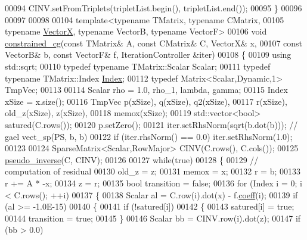 \begin{DoxyCode}
00094   CINV.setFromTriplets(tripletList.begin(), tripletList.end());
00095 \}
00096 
00097 
00098 
00104 \textcolor{keyword}{template}<\textcolor{keyword}{typename} TMatrix, \textcolor{keyword}{typename} CMatrix,
00105          \textcolor{keyword}{typename} \hyperlink{group___core___module}{VectorX}, \textcolor{keyword}{typename} VectorB, \textcolor{keyword}{typename} VectorF>
00106 \textcolor{keywordtype}{void} \hyperlink{namespace_eigen_1_1internal_a1c2f99746877fd46158af4a6b7dce2f9}{constrained\_cg}(\textcolor{keyword}{const} TMatrix& A, \textcolor{keyword}{const} CMatrix& C, VectorX& x,
00107                        \textcolor{keyword}{const} VectorB& b, \textcolor{keyword}{const} VectorF& f, IterationController &iter)
00108 \{
00109   \textcolor{keyword}{using} std::sqrt;
00110   \textcolor{keyword}{typedef} \textcolor{keyword}{typename} TMatrix::Scalar Scalar;
00111   \textcolor{keyword}{typedef} \textcolor{keyword}{typename} TMatrix::Index \hyperlink{namespace_eigen_a62e77e0933482dafde8fe197d9a2cfde}{Index};
00112   \textcolor{keyword}{typedef} Matrix<Scalar,Dynamic,1>  TmpVec;
00113 
00114   Scalar rho = 1.0, rho\_1, lambda, gamma;
00115   Index xSize = x.size();
00116   TmpVec  p(xSize), q(xSize), q2(xSize),
00117           r(xSize), old\_z(xSize), z(xSize),
00118           memox(xSize);
00119   std::vector<bool> satured(C.rows());
00120   p.setZero();
00121   iter.setRhsNorm(sqrt(b.dot(b))); \textcolor{comment}{// gael vect\_sp(PS, b, b)}
00122   \textcolor{keywordflow}{if} (iter.rhsNorm() == 0.0) iter.setRhsNorm(1.0);
00123 
00124   SparseMatrix<Scalar,RowMajor> CINV(C.rows(), C.cols());
00125   \hyperlink{namespace_eigen_1_1internal_a58a0ccf0e71d88beeb5dcf72ed0bdd5f}{pseudo\_inverse}(C, CINV);
00126 
00127   \textcolor{keywordflow}{while}(\textcolor{keyword}{true})
00128   \{
00129     \textcolor{comment}{// computation of residual}
00130     old\_z = z;
00131     memox = x;
00132     r = b;
00133     r += A * -x;
00134     z = r;
00135     \textcolor{keywordtype}{bool} transition = \textcolor{keyword}{false};
00136     \textcolor{keywordflow}{for} (Index i = 0; i < C.rows(); ++i)
00137     \{
00138       Scalar al = C.row(i).dot(x) - f.\hyperlink{class_eigen_1_1_plain_object_base_afbfc12954f16d21aedb7bd839f64a278}{coeff}(i);
00139       \textcolor{keywordflow}{if} (al >= -1.0E-15)
00140       \{
00141         \textcolor{keywordflow}{if} (!satured[i])
00142         \{
00143           satured[i] = \textcolor{keyword}{true};
00144           transition = \textcolor{keyword}{true};
00145         \}
00146         Scalar bb = CINV.row(i).dot(z);
00147         \textcolor{keywordflow}{if} (bb > 0.0)

\end{DoxyCode}
